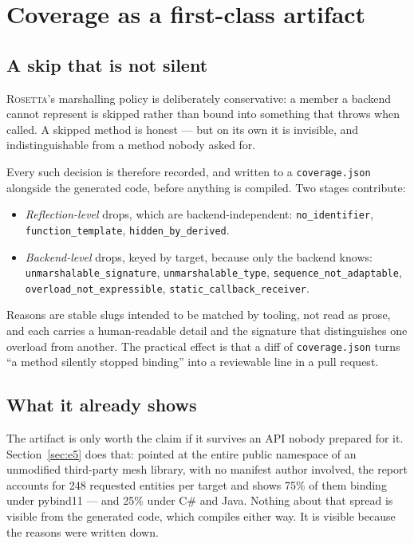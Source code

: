 \documentclass[11pt,a4paper]{article}
\newcommand{\rosetta}{\textsc{Rosetta}}
\newcommand{\code}[1]{\texttt{\small #1}}
\begin{document}
\section{Coverage as a first-class artifact}
\label{sec:coverage}

\subsection{A skip that is not silent}

\rosetta's marshalling policy is deliberately conservative: a member a backend
cannot represent is skipped rather than bound into something that throws when
called. A skipped method is honest --- but on its own it is invisible, and
indistinguishable from a method nobody asked for.

Every such decision is therefore recorded, and written to a
\code{coverage.json} alongside the generated code, before anything is compiled.
Two stages contribute:

\begin{itemize}\raggedright\setlength{\itemsep}{2pt}
  \item \emph{Reflection-level} drops, which are backend-independent:
    \code{no\_identifier}, \code{function\_template},
    \code{hidden\_by\_derived}.
  \item \emph{Backend-level} drops, keyed by target, because only the backend
    knows: \code{unmarshalable\_signature}, \code{unmarshalable\_type},
    \code{sequence\_not\_adaptable}, \code{overload\_not\_expressible},
    \code{static\_callback\_receiver}.
\end{itemize}

Reasons are stable slugs intended to be matched by tooling, not read as prose,
and each carries a human-readable detail and the signature that distinguishes
one overload from another. The practical effect is that a diff of
\code{coverage.json} turns ``a method silently stopped binding'' into a
reviewable line in a pull request.

\subsection{What it already shows}

The artifact is only worth the claim if it survives an API nobody prepared for
it. Section~\ref{sec:e5} does that: pointed at the entire public namespace of an
unmodified third-party mesh library, with no manifest author involved, the
report accounts for 248 requested entities per target and shows 75\% of them
binding under pybind11 --- and 25\% under C\# and Java. Nothing about that
spread is visible from the generated code, which compiles either way. It is
visible because the reasons were written down.
\end{document}
